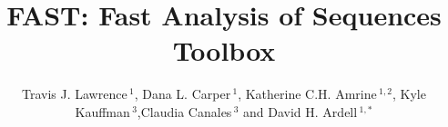 \documentclass{frontiersSCNS} %
\def\firstAuthorLast{Lawrence {et~al.}} %
\def\Authors{Travis J. Lawrence\,$^{1}$, Dana L. Carper\,$^{1}$, Katherine C.H. Amrine\,$^{1,2}$, Kyle Kauffman\,$^{3}$,Claudia Canales\,$^{3}$ and David H. Ardell\,$^{1,*}$}
\begin{document}
\onecolumn
{}

\title[FAST]{FAST: Fast Analysis of Sequences Toolbox}
\author[\firstAuthorLast ]{\Authors}
\address{}
\correspondance{}
\extraAuth{}%
\topic{}%

\maketitle

\end{document}
